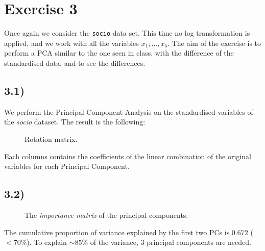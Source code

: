 \documentclass[a4paper,11pt,oneside]{report}
\begin{document}
\newpage
\section*{Exercise 3}
Once again we consider the \texttt{socio} data set. This time no log transformation is applied, and we work with all the variables $x_1,\dots, x_5$.
The aim of the exercise is to perform a PCA similar to the one seen in class, with the difference of the standardised data, and to see the differences.
\subsection*{3.1)}
	We perform the Principal Component Analysis on the standardised variables of the \textit{socio} dataset. The result is the following:
	\begin{figure}[H]
	\centering
	\begin{varwidth}{\linewidth}
	
	\end{varwidth}
	\caption{Rotation matrix.}
	\label{fig:rot}
	\end{figure}
	Each columns contains the coefficients of the linear combination of the original variables for each Principal Component.

\subsection*{3.2)}
	\begin{figure}[H]
	\centering
	\begin{varwidth}{\linewidth}
	
	\end{varwidth}
	\caption{The \textit{importance matrix} of the principal components.}
	\end{figure}
	The cumulative proportion of variance explained by the first two PCs is $0.672$ ($< 70\%$). To explain $\sim 85\%$ of the variance, 3 principal components are needed.
\end{document}
